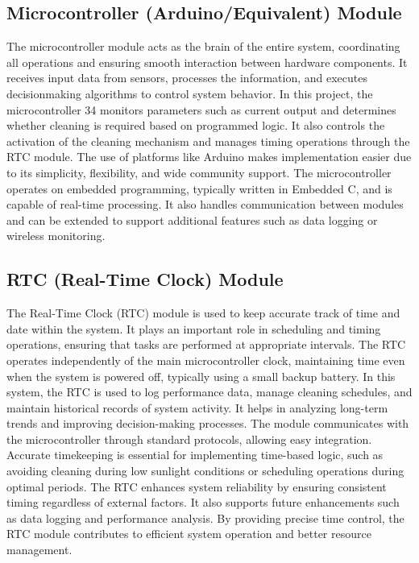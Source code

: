 \documentclass[10pt]{report}
\begin{document}
\begin{sloppypar}
{{{\begin{sloppypar}
\subsection{Microcontroller (Arduino/Equivalent) Module}
\hspace{0.5cm}
The microcontroller module acts as the brain of the entire system, coordinating all
operations and ensuring smooth interaction between hardware components. It receives input data from sensors, processes the information, and executes decisionmaking algorithms to control system behavior. In this project, the microcontroller
34
monitors parameters such as current output and determines whether cleaning is required based on programmed logic. It also controls the activation of the cleaning
mechanism and manages timing operations through the RTC module. The use of
platforms like Arduino makes implementation easier due to its simplicity, flexibility,
and wide community support. The microcontroller operates on embedded programming, typically written in Embedded C, and is capable of real-time processing. It also
handles communication between modules and can be extended to support additional
features such as data logging or wireless monitoring.

\subsection{RTC (Real-Time Clock) Module}
\hspace{0.5cm}The Real-Time Clock (RTC) module is used to keep accurate track of time and date
within the system. It plays an important role in scheduling and timing operations,
ensuring that tasks are performed at appropriate intervals. The RTC operates independently of the main microcontroller clock, maintaining time even when the system is powered off, typically using a small backup battery. In this system, the RTC
is used to log performance data, manage cleaning schedules, and maintain historical records of system activity. It helps in analyzing long-term trends and improving decision-making processes. The module communicates with the microcontroller
through standard protocols, allowing easy integration. Accurate timekeeping is essential for implementing time-based logic, such as avoiding cleaning during low
sunlight conditions or scheduling operations during optimal periods. The RTC enhances system reliability by ensuring consistent timing regardless of external factors.
It also supports future enhancements such as data logging and performance analysis.
By providing precise time control, the RTC module contributes to efficient system
operation and better resource management.


\end{sloppypar}}}}
\end{sloppypar}
\end{document}
